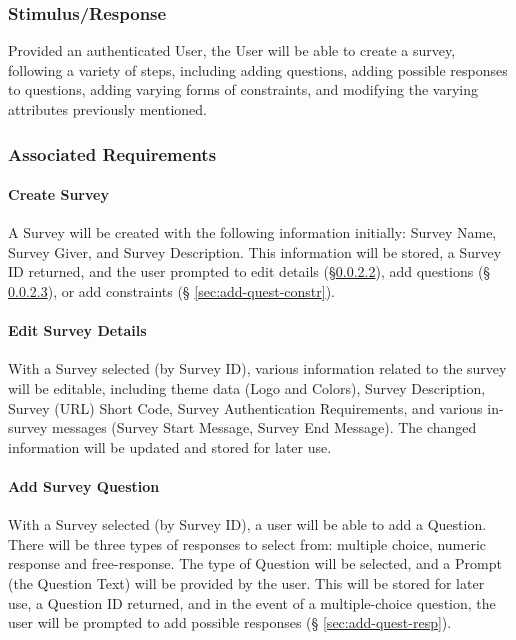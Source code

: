 \documentclass[10pt,letter]{report}
\begin{document}
\subsubsection{Stimulus/Response}
\label{sec:stim-resp-designer}

Provided an authenticated User, the User will be able to create a
survey, following a variety of steps, including adding questions,
adding possible responses to questions, adding varying forms of
constraints, and modifying the varying attributes previously
mentioned.

\subsubsection{Associated Requirements}
\label{sec:assoc-req-designer}

\paragraph{Create Survey}
\label{sec:create-survey}

A Survey will be created with the following information initially:
Survey Name, Survey Giver, and Survey Description.  This information
will be stored, a Survey ID returned, and the user prompted to edit
details (\S \ref{sec:edit-survey-details}), add questions (\S
\ref{sec:add-survey-question}), or add constraints (\S
\ref{sec:add-quest-constr}).

\paragraph{Edit Survey Details}
\label{sec:edit-survey-details}

With a Survey selected (by Survey ID), various information related to
the survey will be editable, including theme data (Logo and Colors),
Survey Description, Survey (URL) Short Code, Survey Authentication
Requirements, and various in-survey messages (Survey Start Message,
Survey End Message).  The changed information will be updated and
stored for later use.

\paragraph{Add Survey Question}
\label{sec:add-survey-question}

With a Survey selected (by Survey ID), a user will be able to add a
Question.  There will be three types of responses to select from:
multiple choice, numeric response and free-response.  The type of
Question will be selected, and a Prompt (the Question Text) will be
provided by the user.  This will be stored for later use, a Question
ID returned, and in the event of a multiple-choice question, the user
will be prompted to add possible responses (\S
\ref{sec:add-quest-resp}).
\end{document}
